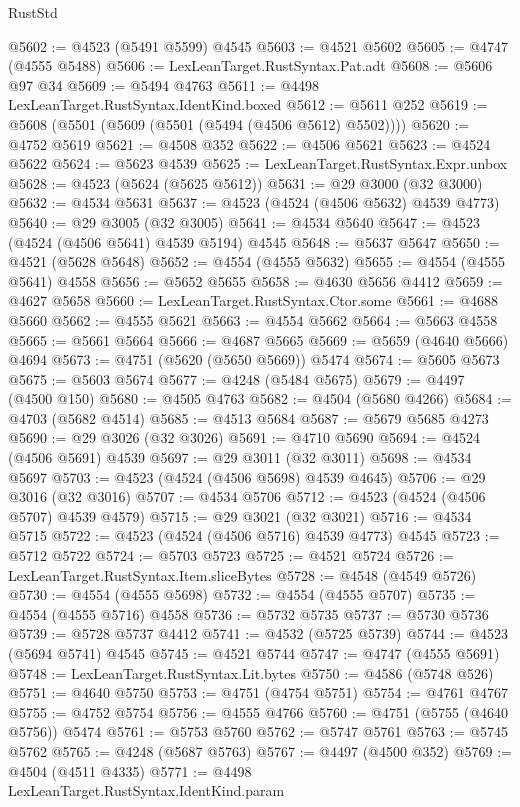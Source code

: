 \begin{lexlean}{RustStd}
\begin{coremodule}
@5602 := @4523 (@5491 @5599) @4545
@5603 := @4521 @5602
@5605 := @4747 (@4555 @5488)
@5606 := LexLeanTarget.RustSyntax.Pat.adt
@5608 := @5606 @97 @34
@5609 := @5494 @4763
@5611 := @4498 LexLeanTarget.RustSyntax.IdentKind.boxed
@5612 := @5611 @252
@5619 := @5608 (@5501 (@5609 (@5501 (@5494 (@4506 @5612) @5502))))
@5620 := @4752 @5619
@5621 := @4508 @352
@5622 := @4506 @5621
@5623 := @4524 @5622
@5624 := @5623 @4539
@5625 := LexLeanTarget.RustSyntax.Expr.unbox
@5628 := @4523 (@5624 (@5625 @5612))
@5631 := @29 @3000 (@32 @3000)
@5632 := @4534 @5631
@5637 := @4523 (@4524 (@4506 @5632) @4539 @4773)
@5640 := @29 @3005 (@32 @3005)
@5641 := @4534 @5640
@5647 := @4523 (@4524 (@4506 @5641) @4539 @5194) @4545
@5648 := @5637 @5647
@5650 := @4521 (@5628 @5648)
@5652 := @4554 (@4555 @5632)
@5655 := @4554 (@4555 @5641) @4558
@5656 := @5652 @5655
@5658 := @4630 @5656 @4412
@5659 := @4627 @5658
@5660 := LexLeanTarget.RustSyntax.Ctor.some
@5661 := @4688 @5660
@5662 := @4555 @5621
@5663 := @4554 @5662
@5664 := @5663 @4558
@5665 := @5661 @5664
@5666 := @4687 @5665
@5669 := @5659 (@4640 @5666) @4694
@5673 := @4751 (@5620 (@5650 @5669)) @5474
@5674 := @5605 @5673
@5675 := @5603 @5674
@5677 := @4248 (@5484 @5675)
@5679 := @4497 (@4500 @150)
@5680 := @4505 @4763
@5682 := @4504 (@5680 @4266)
@5684 := @4703 (@5682 @4514)
@5685 := @4513 @5684
@5687 := @5679 @5685 @4273
@5690 := @29 @3026 (@32 @3026)
@5691 := @4710 @5690
@5694 := @4524 (@4506 @5691) @4539
@5697 := @29 @3011 (@32 @3011)
@5698 := @4534 @5697
@5703 := @4523 (@4524 (@4506 @5698) @4539 @4645)
@5706 := @29 @3016 (@32 @3016)
@5707 := @4534 @5706
@5712 := @4523 (@4524 (@4506 @5707) @4539 @4579)
@5715 := @29 @3021 (@32 @3021)
@5716 := @4534 @5715
@5722 := @4523 (@4524 (@4506 @5716) @4539 @4773) @4545
@5723 := @5712 @5722
@5724 := @5703 @5723
@5725 := @4521 @5724
@5726 := LexLeanTarget.RustSyntax.Item.sliceBytes
@5728 := @4548 (@4549 @5726)
@5730 := @4554 (@4555 @5698)
@5732 := @4554 (@4555 @5707)
@5735 := @4554 (@4555 @5716) @4558
@5736 := @5732 @5735
@5737 := @5730 @5736
@5739 := @5728 @5737 @4412
@5741 := @4532 (@5725 @5739)
@5744 := @4523 (@5694 @5741) @4545
@5745 := @4521 @5744
@5747 := @4747 (@4555 @5691)
@5748 := LexLeanTarget.RustSyntax.Lit.bytes
@5750 := @4586 (@5748 @526)
@5751 := @4640 @5750
@5753 := @4751 (@4754 @5751)
@5754 := @4761 @4767
@5755 := @4752 @5754
@5756 := @4555 @4766
@5760 := @4751 (@5755 (@4640 @5756)) @5474
@5761 := @5753 @5760
@5762 := @5747 @5761
@5763 := @5745 @5762
@5765 := @4248 (@5687 @5763)
@5767 := @4497 (@4500 @352)
@5769 := @4504 (@4511 @4335)
@5771 := @4498 LexLeanTarget.RustSyntax.IdentKind.param

\end{coremodule}
\end{lexlean}
